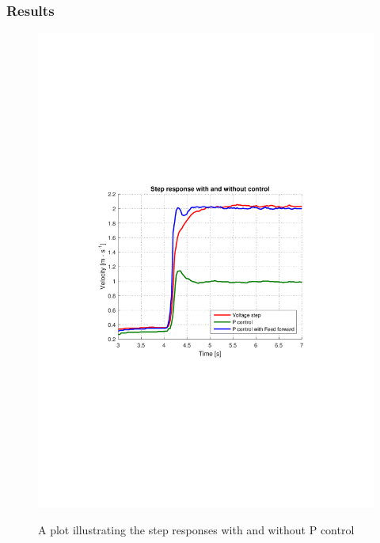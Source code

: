 \subsubsection{Results}
\begin{figure}[H]
  \centering
  {
    \includegraphics[width=1.4\textwidth]{figures/stepWithPControl.pdf}
  }
  \caption{A plot illustrating the step responses with and without P control}
  \label{PconTest}
\end{figure}

